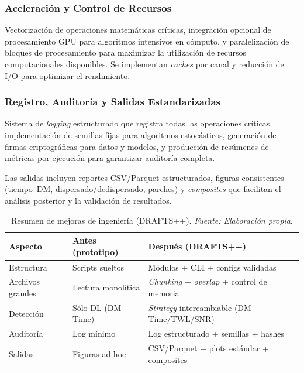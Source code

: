 \subsubsection{Aceleración y Control de Recursos}

Vectorización de operaciones matemáticas críticas, integración opcional de procesamiento GPU para algoritmos intensivos en cómputo, y paralelización de bloques de procesamiento para maximizar la utilización de recursos computacionales disponibles. Se implementan \textit{caches} por canal y reducción de I/O para optimizar el rendimiento.

\subsubsection{Registro, Auditoría y Salidas Estandarizadas}

Sistema de \emph{logging} estructurado que registra todas las operaciones críticas, implementación de semillas fijas para algoritmos estocásticos, generación de firmas criptográficas para datos y modelos, y producción de resúmenes de métricas por ejecución para garantizar auditoría completa.

Las salidas incluyen reportes CSV/Parquet estructurados, figuras consistentes (tiempo--DM, dispersado/dedispersado, parches) y \textit{composites} que facilitan el análisis posterior y la validación de resultados.

\begin{table}[H] 
\centering 
  \caption{\label{tab:mejoras} Resumen de mejoras de ingeniería (DRAFTS++). \textit{Fuente: Elaboración propia}.}
\begin{tabular}{p{} p{} p{}} 
\toprule 
    \textbf{Aspecto} & \textbf{Antes (prototipo)} & \textbf{Después (DRAFTS++)} \\
\midrule 
Estructura & Scripts sueltos & Módulos + CLI + configs validadas \\ 
    Archivos grandes & Lectura monolítica & \emph{Chunking} + \emph{overlap} + control de memoria \\
    Detección & Sólo DL (DM--Time) & \emph{Strategy} intercambiable (DM--Time/TWL/SNR) \\
Auditoría & Log mínimo & Log estructurado + semillas + hashes \\ 
    Salidas & Figuras ad hoc & CSV/Parquet + plots estándar + composites \\
\bottomrule 
\end{tabular} 
\end{table}

